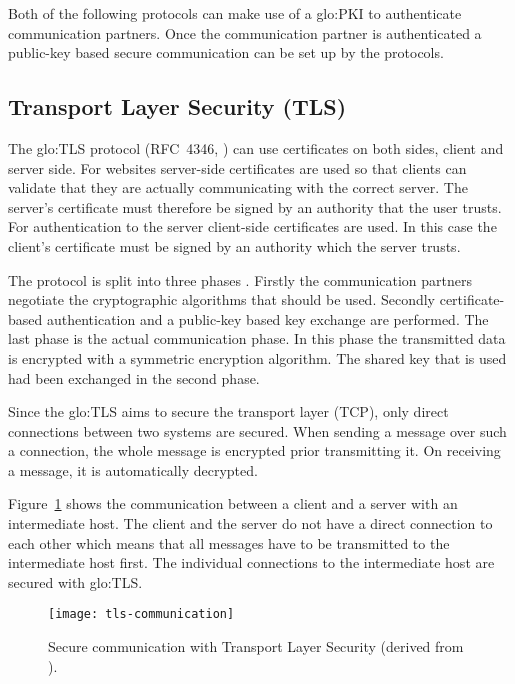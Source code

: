 Both  of  the following  protocols  can make  use  of  a \gls{glo:PKI}  to
authenticate  communication partners.  Once  the communication  partner is
authenticated a public-key based secure communication can be set up by the
protocols.

\subsection[Transport Layer Security]{Transport Layer Security (TLS)}
\label{sec:fundamentals:tls}

The \gls{glo:TLS} protocol (RFC~4346, \cite{rfc4346}) can use certificates
on  both sides,  \ie  client  and server  side.  For websites  server-side
certificates are used so that  clients can validate that they are actually
communicating  with  the correct  server.  The  server's certificate  must
therefore  be  signed   by  an  authority  that  the   user  trusts.   For
authentication to  the server client-side certificates are  used.  In this
case the  client's certificate  must be signed  by an authority  which the
server trusts.

The  protocol is  split  into three  phases  \cite{rfc4346}.  Firstly  the
communication partners negotiate  the cryptographic algorithms that should
be used.  Secondly certificate-based authentication and a public-key based
key exchange  are performed.  The  last phase is the  actual communication
phase. In  this phase the transmitted  data is encrypted  with a symmetric
encryption algorithm.  The shared key that  is used had  been exchanged in
the second phase.

Since the \gls{glo:TLS} aims to secure the transport layer (\eg TCP), only
direct  connections  between two  systems  are  secured.   When sending  a
message  over such  a connection,  the  whole message  is encrypted  prior
transmitting it.  On receiving a message, it is automatically decrypted.

Figure~\ref{fig:tls-communication}  shows   the  communication  between  a
client and a  server with an intermediate host. The  client and the server
do  not have  a  direct connection  to  each other  which  means that  all
messages  have to  be transmitted  to  the intermediate  host first.   The
individual  connections   to  the  intermediate  host   are  secured  with
\gls{glo:TLS}.

\begin{figure}[ht]
  \centering
  \texttt{[image: tls-communication]}
  \caption[Secure   communication  with  TLS]{Secure   communication  with
    Transport Layer Security (derived from \cite{mls}).}
  \label{fig:tls-communication}
\end{figure}

